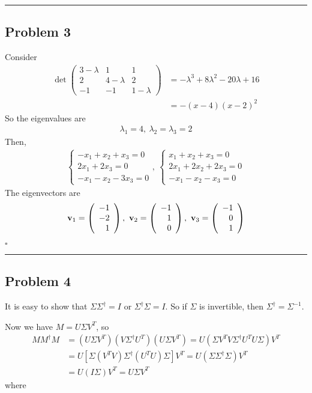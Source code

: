 \documentclass[12pt]{article}
\newcommand*{\QEDB}{\hfill\ensuremath{\square}}
\newcommand{\SBrackets}[1]{\left[#1\right]}
\newcommand{\ParTh}[1]{\left(#1\right)}
\newcommand{\BF}[1]{{\bf#1}}
\newcommand{\Matrix}[2]{\ParTh{\begin{array}{#1}#2\end{array}}}
\newcommand{\horrule}[1]{\rule{\linewidth}{#1}}
\begin{document}
\horrule{0.5pt}

\subsection*{Problem 3}

Consider
\begin{align}
\det\Matrix{ccc}{3-\lambda&1&1\\2&4-\lambda&2\\-1&-1&1-\lambda}&=-\lambda^3+8\lambda^2-20\lambda+16\\
&=-\ParTh{x-4}\ParTh{x-2}^2
\end{align}
So the eigenvalues are
\begin{align}
\lambda_1=4,~\lambda_2=\lambda_3=2
\end{align}
Then,
\begin{align}
\left\{
\begin{array}{l}
-x_1+x_2+x_3=0\\
2x_1+2x_3=0\\
-x_1-x_2-3x_3=0
\end{array}
\right.,~
\left\{
\begin{array}{l}
x_1+x_2+x_3=0\\
2x_1+2x_2+2x_3=0\\
-x_1-x_2-x_3=0
\end{array}
\right.
\end{align}
The eigenvectors are
\begin{align}
\BF{v}_1=\Matrix{r}{-1\\-2\\1},~\BF{v}_2=\Matrix{r}{-1\\1\\0},~\BF{v}_3=\Matrix{r}{-1\\0\\1}
\end{align}

\QEDB

\horrule{0.5pt}

\subsection*{Problem 4}

It is easy to show that $\Sigma\Sigma^\dagger=I$ or $\Sigma^\dagger\Sigma=I$. So if $\Sigma$ is invertible, then $\Sigma^\dagger=\Sigma^{-1}$.

Now we have $M=U\Sigma V^T$, so
\begin{align}
MM^{\dagger}M&=\ParTh{U\Sigma V^T}\ParTh{V\Sigma^{\dagger} U^T}\ParTh{U\Sigma V^T}=U\ParTh{\Sigma V^TV\Sigma^{\dagger}U^TU\Sigma}V^T\\
&=U\SBrackets{\Sigma\ParTh{V^TV}\Sigma^{\dagger}\ParTh{U^TU}\Sigma}V^T=U\ParTh{\Sigma\Sigma^\dagger \Sigma}V^T\\
&=U\ParTh{I\Sigma}V^T=U\Sigma V^T
\end{align}
where
\end{document}
